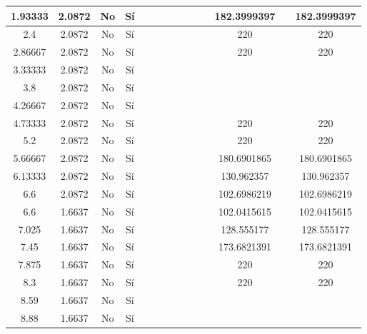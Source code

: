 \begin{table}[H]
{\begin{tabular}{|c|c|c|c|c|c|c|c|c|c|c|c|c|c|}
1.93333 & 2.0872 & No  & Sí  &     &     &     &     &     &     &     & 182.3999397 &     & 182.3999397 \bigstrut\\
\hline
2.4 & 2.0872 & No  & Sí  &     &     &     &     &     &     &     & 220 &     & 220 \bigstrut\\
\hline
2.86667 & 2.0872 & No  & Sí  &     &     &     &     &     &     &     & 220 &     & 220 \bigstrut\\
\hline
3.33333 & 2.0872 & No  & Sí  &     &     &     &     &     &     &     &     &     &  \bigstrut\\
\hline
3.8 & 2.0872 & No  & Sí  &     &     &     &     &     &     &     &     &     &  \bigstrut\\
\hline
4.26667 & 2.0872 & No  & Sí  &     &     &     &     &     &     &     &     &     &  \bigstrut\\
\hline
4.73333 & 2.0872 & No  & Sí  &     &     &     &     &     &     &     & 220 &     & 220 \bigstrut\\
\hline
5.2 & 2.0872 & No  & Sí  &     &     &     &     &     &     &     & 220 &     & 220 \bigstrut\\
\hline
5.66667 & 2.0872 & No  & Sí  &     &     &     &     &     &     &     & 180.6901865 &     & 180.6901865 \bigstrut\\
\hline
6.13333 & 2.0872 & No  & Sí  &     &     &     &     &     &     &     & 130.962357 &     & 130.962357 \bigstrut\\
\hline
6.6 & 2.0872 & No  & Sí  &     &     &     &     &     &     &     & 102.6986219 &     & 102.6986219 \bigstrut\\
\hline
6.6 & 1.6637 & No  & Sí  &     &     &     &     &     &     &     & 102.0415615 &     & 102.0415615 \bigstrut\\
\hline
7.025 & 1.6637 & No  & Sí  &     &     &     &     &     &     &     & 128.555177 &     & 128.555177 \bigstrut\\
\hline
7.45 & 1.6637 & No  & Sí  &     &     &     &     &     &     &     & 173.6821391 &     & 173.6821391 \bigstrut\\
\hline
7.875 & 1.6637 & No  & Sí  &     &     &     &     &     &     &     & 220 &     & 220 \bigstrut\\
\hline
8.3 & 1.6637 & No  & Sí  &     &     &     &     &     &     &     & 220 &     & 220 \bigstrut\\
\hline
8.59 & 1.6637 & No  & Sí  &     &     &     &     &     &     &     &     &     &  \bigstrut\\
\hline
8.88 & 1.6637 & No  & Sí  &     &     &     &     &     &     &     &     &     &  \bigstrut\\

\end{tabular}}
\end{table}
